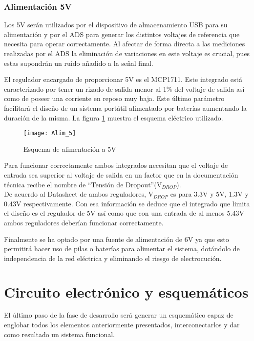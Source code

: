 \subsubsection{Alimentación 5V\label{sec:Alimentacion_5V}}

Los 5V serán utilizados por el dispositivo de almacenamiento USB para su alimentación y por el ADS para generar los distintos voltajes de referencia que necesita para operar correctamente. Al afectar de forma directa a las mediciones realizadas por el ADS la eliminación de variaciones en este voltaje es crucial, pues estas supondrán un ruido añadido a la señal final.

El regulador encargado de proporcionar 5V es el MCP1711. Este integrado está caracterizado por tener un rizado de salida menor al 1\% del voltaje de salida así como de poseer una corriente en reposo muy baja. Este último parámetro facilitará el diseño de un sistema portátil alimentado por baterías aumentando la duración de la misma. La figura \ref{fig:Alim_5} muestra el esquema eléctrico utilizado.

\begin{figure} [h]
    \centering
    \texttt{[image: Alim\_5]}
    \caption{Esquema de alimentación a 5V}
    \label{fig:Alim_5}
\end{figure}

Para funcionar correctamente ambos integrados necesitan que el voltaje de entrada sea superior al voltaje de salida en un factor que en la documentación técnica recibe el nombre de ``\gls{Tensión de Dropout}''(V$_{DROP}$).
\\De acuerdo al Datasheet de ambos reguladores, V$_{DROP}$ es para 3.3V y 5V, 1.3V y 0.43V respectivamente. Con esa información se deduce que el integrado que limita el diseño es el regulador de 5V así como que con una entrada de al menos 5.43V ambos reguladores deberían funcionar correctamente.

Finalmente se ha optado por una fuente de alimentación de 6V ya que esto permitirá hacer uso de pilas o baterías para alimentar el sistema, dotándolo de independencia de la red eléctrica y eliminando el riesgo de electrocución.

\clearpage

\section{Circuito electrónico y esquemáticos\label{sec:Esquemáticos}}

El último paso de la fase de desarrollo será generar un esquemático capaz de englobar todos los elementos anteriormente presentados, interconectarlos y dar como resultado un sistema funcional.

